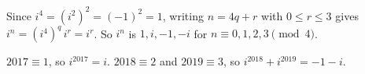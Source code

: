 Since $i^4=(i^2)^2=(-1)^2=1$, writing $n=4q+r$ with $0\le r\le3$ gives $i^n=(i^4)^q\,i^r=i^r$. So $i^n$ is $1,i,-1,-i$ for $n\equiv0,1,2,3\pmod4$.

$2017\equiv1$, so $i^{2017}=\boxed{i}$. $2018\equiv2$ and $2019\equiv3$, so $i^{2018}+i^{2019}=\boxed{-1-i}$.
